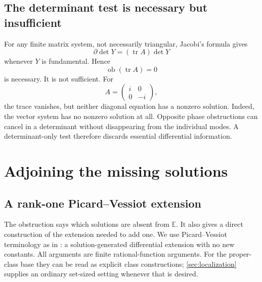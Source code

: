 \documentclass[11pt,a4paper]{article}
\numberwithin{equation}{section}
\theoremstyle{definition}
\theoremstyle{remark}
\newcommand{\E}{\mathbb E}
\newcommand{\D}{\partial}
\newcommand{\ob}{\operatorname{ob}}
\newcommand{\tr}{\operatorname{tr}}
\begin{document}
\subsection{The determinant test is necessary but insufficient}
For any finite matrix system, not necessarily triangular, Jacobi's formula
gives
\[
 \D\det Y=(\tr A)\det Y
\]
whenever $Y$ is fundamental. Hence
\begin{equation}\label{eq:tracenecessary}
 \ob(\tr A)=0
\end{equation}
is necessary. It is not sufficient. For
\[
 A=\begin{pmatrix}i&0\\0&-i\end{pmatrix},
\]
the trace vanishes, but neither diagonal equation has a nonzero solution.
Indeed, the vector system has no nonzero solution at all. Opposite phase
obstructions can cancel in a determinant without disappearing from the
individual modes. A determinant-only test therefore discards essential
differential information.

\section{Adjoining the missing solutions}\label{sec:PV}

\subsection{A rank-one Picard--Vessiot extension}
The obstruction says which solutions are absent from $\E$. It also gives
a direct construction of the extension needed to add one. We use
Picard--Vessiot terminology as in \cite{PS}: a solution-generated
differential extension with no new constants. All arguments are finite
rational-function arguments. For the proper-class base they can be read
as explicit class constructions; \cref{sec:localization} supplies an
ordinary set-sized setting whenever that is desired.
\end{document}
